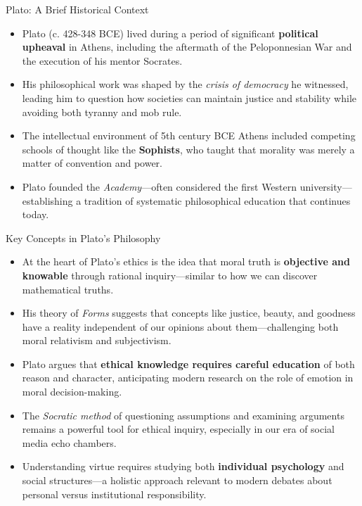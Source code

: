 \documentclass[aspectratio=169]{beamer}
\begin{document}
\begin{frame}{Plato: A Brief Historical Context}
\begin{itemize}
\item Plato (c. 428-348 BCE) lived during a period of significant \textbf{political upheaval} in Athens, including the aftermath of the Peloponnesian War and the execution of his mentor Socrates.
\item His philosophical work was shaped by the \emph{crisis of democracy} he witnessed, leading him to question how societies can maintain justice and stability while avoiding both tyranny and mob rule.
\item The intellectual environment of 5th century BCE Athens included competing schools of thought like the \textbf{Sophists}, who taught that morality was merely a matter of convention and power.
\item Plato founded the \emph{Academy}—often considered the first Western university—establishing a tradition of systematic philosophical education that continues today.
\end{itemize}
\end{frame}

\begin{frame}{Key Concepts in Plato's Philosophy}
\begin{itemize}
\item At the heart of Plato's ethics is the idea that moral truth is \textbf{objective and knowable} through rational inquiry—similar to how we can discover mathematical truths.
\item His theory of \emph{Forms} suggests that concepts like justice, beauty, and goodness have a reality independent of our opinions about them—challenging both moral relativism and subjectivism.
\item Plato argues that \textbf{ethical knowledge requires careful education} of both reason and character, anticipating modern research on the role of emotion in moral decision-making.
\item The \emph{Socratic method} of questioning assumptions and examining arguments remains a powerful tool for ethical inquiry, especially in our era of social media echo chambers.
\item Understanding virtue requires studying both \textbf{individual psychology} and social structures—a holistic approach relevant to modern debates about personal versus institutional responsibility.
\end{itemize}
\end{frame}
\end{document}
